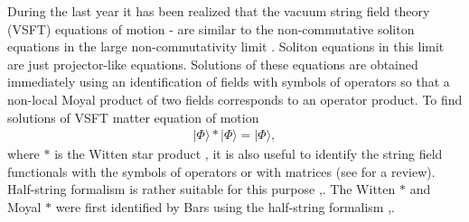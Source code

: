 \documentclass[a4paper,12pt]{article}
\begin{document}
During the last year it has been realized that
the  vacuum string field theory (VSFT) equations of motion
\cite{0012251}-\cite{0111129} are similar  to the non-commutative soliton
equations  in the large non-commutativity limit \cite{GMS}.
Soliton equations  in this limit are just  projector-like equations.
Solutions of these equations are obtained immediately using an identification
of fields with symbols of operators so that a non-local Moyal product
of two fields  corresponds to an operator product.
To find solutions of VSFT matter equation of motion
\begin{gather*}
|\Phi\rangle*|\Phi\rangle=|\Phi\rangle,
\end{gather*}
where $*$ is the Witten star product \cite{Witten},
it is also useful to identify the string field functionals
with the symbols of operators or with matrices (see \cite{ABGKM} for a review).
Half-string formalism is rather suitable for this purpose
\cite{0105058},\cite{0105059}.
The Witten $*$ and Moyal $*$ were first
identified by Bars using the half-string formalism
\cite{0106157},\cite{0202030}.
\end{document}
